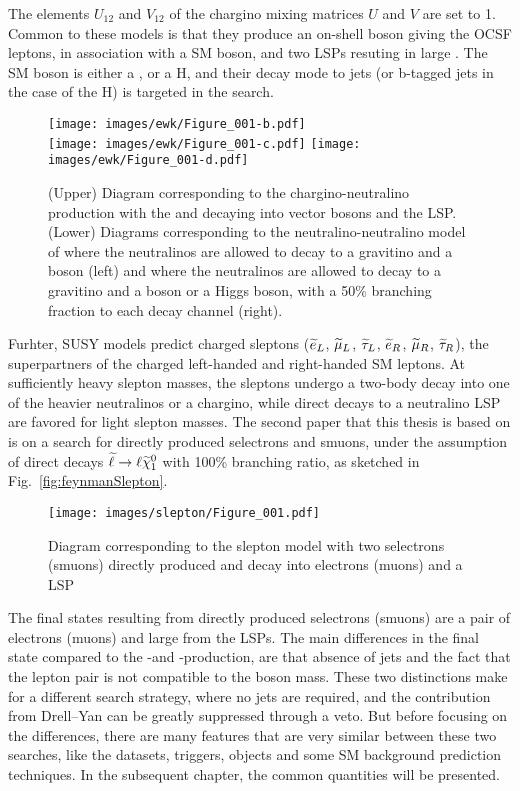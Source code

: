 The elements $U_{12}$ and $V_{12}$ of the chargino mixing matrices $U$ and $V$ are set to 1.
Common to these models is that they produce an on-shell \PZ boson giving the OCSF leptons, in association with a SM boson, and two LSPs resuting in large \ptmiss. 
The SM boson is either a \PW, \PZ or a H, and their decay mode to jets (or b-tagged jets in the case of the H) is targeted in the search.   
\begin{figure}[!h]
\centering
\texttt{[image: images/ewk/Figure\_001-b.pdf]}\\
\texttt{[image: images/ewk/Figure\_001-c.pdf]}
\texttt{[image: images/ewk/Figure\_001-d.pdf]}
\caption{(Upper) Diagram corresponding to the chargino-neutralino production with the \firstcharg and \secondchi decaying into vector bosons and the LSP. 
(Lower) Diagrams corresponding to the neutralino-neutralino model of where the neutralinos are allowed to decay to a gravitino and a \PZ boson (left) and where the neutralinos are allowed to decay to a gravitino and a \PZ boson or a Higgs boson, with a 50\% branching fraction to each decay channel (right).}
\label{sig:feynmanEWK}
\end{figure}                                                                                                                                 
Furhter, SUSY models predict charged sleptons ($\widetilde{e}_{L}$, $\widetilde{\mu}_{L}$, $\widetilde{\tau}_{L}$, $\widetilde{e}_{R}$, $\widetilde{\mu}_{R}$, $\widetilde{\tau}_{R}$), the superpartners of the charged left-handed and right-handed SM leptons. 
At sufficiently heavy slepton masses, the sleptons undergo a two-body decay into one of the heavier neutralinos or a chargino, while direct decays to a neutralino LSP are favored for light slepton masses.
The second paper that this thesis is based on is on a search for directly produced selectrons and smuons, under the assumption of direct decays $\widetilde{\ell}\to \ell\widetilde{\chi}^{0}_{1}$ with 100\% branching ratio, as sketched in Fig.~\ref{fig:feynmanSlepton}.
\begin{figure}[!h]
\centering
\texttt{[image: images/slepton/Figure\_001.pdf]}
\caption{Diagram corresponding to the slepton model with two selectrons (smuons) directly produced and decay into electrons (muons) and a LSP} 
\label{sig:feynmanSlepton}
\end{figure}                                                                                                                                 
The final states resulting from directly produced selectrons (smuons) are a pair of electrons (muons) and large \ptmiss from the LSPs. 
The main differences in the final state compared to the \firstcharg-\secondchi and \firstchi-\firstchi production, are that absence of jets and the fact that the lepton pair is not compatible to the \PZ boson mass. 
These two distinctions make for a different search strategy, where no jets are required, and the contribution from Drell--Yan can be greatly suppressed through a veto. 
But before focusing on the differences, there are many features that are very similar between these two searches, like the datasets, triggers, objects and some SM background prediction techniques. 
In the subsequent chapter, the common quantities will be presented.  

